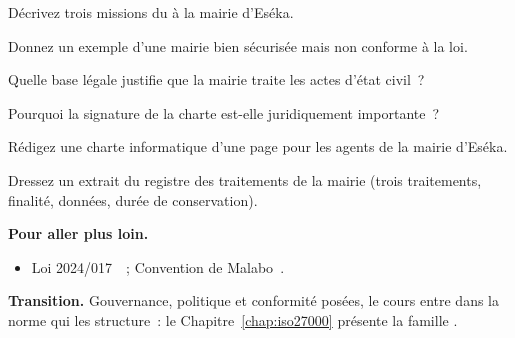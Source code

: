 \begin{boxexo}[title={\ding{45}\quad Exercice~6.5. Rôle du DPO \niveaumoyen}]
Décrivez trois missions du  à la mairie d'Eséka.
\end{boxexo}

\begin{boxexo}[title={\ding{45}\quad Exercice~6.6. Sécurisé mais non conforme \niveaumoyen}]
Donnez un exemple d'une mairie bien sécurisée mais non conforme à la loi.
\end{boxexo}

\begin{boxexo}[title={\ding{45}\quad Exercice~6.7. Base légale \niveaumoyen}]
Quelle base légale justifie que la mairie traite les actes d'état civil~?
\end{boxexo}

\begin{boxexo}[title={\ding{45}\quad Exercice~6.8. Signature \niveaumoyen}]
Pourquoi la signature de la charte est-elle juridiquement importante~?
\end{boxexo}

\begin{boxexo}[title={\ding{45}\quad Exercice~6.9. Charte rédigée \niveauexpert}]
Rédigez une charte informatique d'une page pour les agents de la mairie
d'Eséka.
\end{boxexo}

\begin{boxexo}[title={\ding{45}\quad Exercice~6.10. Registre des traitements \niveauexpert}]
Dressez un extrait du registre des traitements de la mairie (trois traitements,
finalité, données, durée de conservation).
\end{boxexo}

\bigskip

\begin{boxinfo}
\textbf{Pour aller plus loin.}
\begin{itemize}
    \item Loi 2024/017~\cite{loi2024017}~; Convention de Malabo~\cite{malabo2014}.
\end{itemize}
\end{boxinfo}

\begin{boxinfo}
\textbf{Transition.} Gouvernance, politique et conformité posées, le cours
entre dans la norme qui les structure~: le Chapitre~\ref{chap:iso27000}
présente la famille .
\end{boxinfo}

